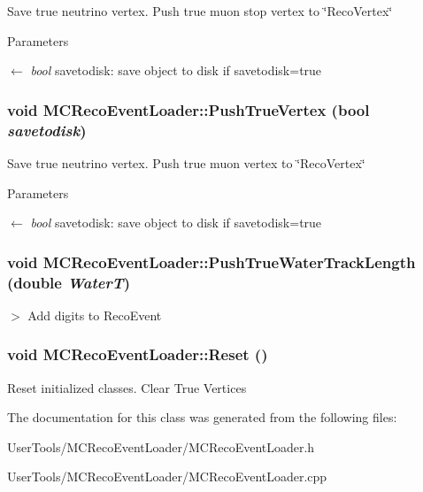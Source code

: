 Save true neutrino vertex. Push true muon stop vertex to \char`\"{}RecoVertex\char`\"{} 
\begin{DoxyParams}{Parameters}
\item[\mbox{$\leftarrow$} {\em bool}]savetodisk: save object to disk if savetodisk=true \end{DoxyParams}
\hypertarget{classMCRecoEventLoader_a4d3d3f6e9b15bd07420b0b10f04eed11}{
\subsubsection[{PushTrueVertex}]{\setlength{\rightskip}{0pt plus 5cm}void MCRecoEventLoader::PushTrueVertex (bool {\em savetodisk})}}
\label{classMCRecoEventLoader_a4d3d3f6e9b15bd07420b0b10f04eed11}


Save true neutrino vertex. Push true muon vertex to \char`\"{}RecoVertex\char`\"{} 
\begin{DoxyParams}{Parameters}
\item[\mbox{$\leftarrow$} {\em bool}]savetodisk: save object to disk if savetodisk=true \end{DoxyParams}
\hypertarget{classMCRecoEventLoader_a79a348512d9c7fb13aa86e96d5f1d39b}{
\subsubsection[{PushTrueWaterTrackLength}]{\setlength{\rightskip}{0pt plus 5cm}void MCRecoEventLoader::PushTrueWaterTrackLength (double {\em WaterT})}}
\label{classMCRecoEventLoader_a79a348512d9c7fb13aa86e96d5f1d39b}


$>$ Add digits to RecoEvent \hypertarget{classMCRecoEventLoader_a1c01acb2c109e46de4e1dc27911843c3}{
\subsubsection[{Reset}]{\setlength{\rightskip}{0pt plus 5cm}void MCRecoEventLoader::Reset ()}}
\label{classMCRecoEventLoader_a1c01acb2c109e46de4e1dc27911843c3}


Reset initialized classes. Clear True Vertices 

The documentation for this class was generated from the following files:\begin{DoxyCompactItemize}
\item 
UserTools/MCRecoEventLoader/MCRecoEventLoader.h\item 
UserTools/MCRecoEventLoader/MCRecoEventLoader.cpp\end{DoxyCompactItemize}
